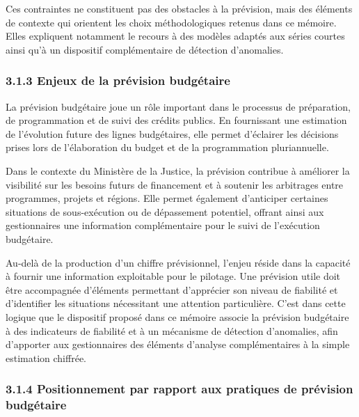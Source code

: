 Ces contraintes ne constituent pas des obstacles \`a la pr\'evision, mais des
\'el\'ements de contexte qui orientent les choix m\'ethodologiques retenus
dans ce m\'emoire. Elles expliquent notamment le recours \`a des mod\`eles
adapt\'es aux s\'eries courtes ainsi qu'\`a un dispositif compl\'ementaire de
d\'etection d'anomalies.

\subsubsection*{3.1.3 \quad Enjeux de la pr\'evision budg\'etaire}

La pr\'evision budg\'etaire joue un r\^ole important dans le processus de
pr\'eparation, de programmation et de suivi des cr\'edits publics. En
fournissant une estimation de l'\'evolution future des lignes budg\'etaires,
elle permet d'\'eclairer les d\'ecisions prises lors de l'\'elaboration du
budget et de la programmation pluriannuelle.

Dans le contexte du Minist\`ere de la Justice, la pr\'evision contribue \`a
am\'eliorer la visibilit\'e sur les besoins futurs de financement et \`a
soutenir les arbitrages entre programmes, projets et r\'egions. Elle permet
\'egalement d'anticiper certaines situations de sous-ex\'ecution ou de
d\'epassement potentiel, offrant ainsi aux gestionnaires une information
compl\'ementaire pour le suivi de l'ex\'ecution budg\'etaire.

Au-del\`a de la production d'un chiffre pr\'evisionnel, l'enjeu r\'eside
dans la capacit\'e \`a fournir une information exploitable pour le pilotage.
Une pr\'evision utile doit \^etre accompagn\'ee d'\'el\'ements permettant
d'appr\'ecier son niveau de fiabilit\'e et d'identifier les situations
n\'ecessitant une attention particuli\`ere. C'est dans cette logique que le
dispositif propos\'e dans ce m\'emoire associe la pr\'evision budg\'etaire
\`a des indicateurs de fiabilit\'e et \`a un m\'ecanisme de d\'etection
d'anomalies, afin d'apporter aux gestionnaires des \'el\'ements d'analyse
compl\'ementaires \`a la simple estimation chiffr\'ee.

\subsubsection*{3.1.4 \quad Positionnement par rapport aux pratiques de pr\'evision budg\'etaire}

